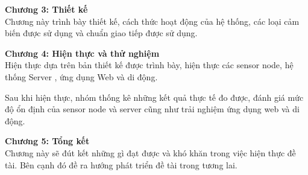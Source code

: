 \textbf{Chương 3: Thiết kế}\\
Chương này trình bày thiết kế, cách thức hoạt động của hệ thống, các loại cảm biến được sử dụng và chuẩn giao tiếp được sử dụng.

\textbf{Chương 4: Hiện thực và thử nghiệm}\\
Hiện thực dựa trên bản thiết kế được trình bày, hiện thực các sensor node, hệ thống Server , ứng dụng Web và di động.

Sau khi hiện thực, nhóm thống kê những kết quả thực tế đo được, đánh giá mức độ ổn định của sensor node và server cũng như trải nghiệm ứng dụng web và di động.

\textbf{Chương 5: Tổng kết}\\
Chương này sẽ đút kết những gì đạt được và khó khăn trong việc hiện thực đề tài. Bên cạnh đó đề ra hướng phát triển đề tài trong tương lai.

